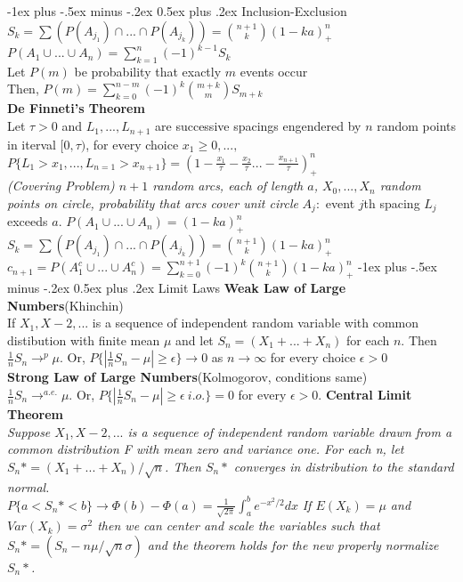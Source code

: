 \documentclass[10pt,landscape]{article}
\makeatletter
\renewcommand{\section}{\@startsection{section}{1}{0mm}%
                                {-1ex plus -.5ex minus -.2ex}%
                                {0.5ex plus .2ex}%
                                {\normalfont\large\bfseries}}
\makeatother
\begin{document}
\begin{multicols*}{3}
\section{Inclusion-Exclusion}
\textit{$S_k= \sum (P(A_{j_1}) \cap...\cap P(A_{j_k}))={n+1 \choose k} (1-ka)^n_+$}\\
\textit{$P(A_1 \cup ...\cup A_n)=\sum_{k=1}^{n} (-1)^{k-1}S_k$}\\
Let $P(m)$ be probability that exactly $m$ events occur \\
Then, \textit{$P(m)=\sum_{k=0}^{n-m}(-1)^{k}{m+k \choose m}S_{m+k}$}\\ 
\textbf{De Finneti's Theorem}\\
Let $\tau>0$ and $L_1 ,..., L_{n+1}$ are successive spacings engendered by $n$ random points in iterval $[0,\tau)$, for every choice $x_1\geq 0, ...,$
\textit{$P\{L_1>x_1,...,L_{n=1}>x_{n+1}\}=(1-\frac{x_1}{\tau}-\frac{x_2}{\tau}...-\frac{x_{n+1}}{\tau})^n_+$}\\
\textit{(Covering Problem) $n+1$ random arcs, each of length $a$, $X_0,...,X_n$ random points on circle, probability that arcs cover unit circle}
$A_j:$ event $j$th spacing $L_j$ exceeds $a$. \textit{$P(A_1 \cup ...\cup A_n)=(1-ka)^n_+$}
\textit{$S_k= \sum (P(A_{j_1}) \cap...\cap P(A_{j_k}))={n+1 \choose k} (1-ka)^n_+$}\\
\textit{$c_{n+1}=P(A_{1}^{c} \cup ...\cup A_{n}^{c})=\sum_{k=0}^{n+1}(-1)^{k}{n+1 \choose k}(1-ka)^n_+$ }  
\section{Limit Laws}
\textbf{Weak Law of Large Numbers}(Khinchin)\\
If $X_1,X-2,...$ is a sequence of independent random variable with common distibution with finite mean $\mu$ and let $S_n=(X_1+...+X_n)$ for each $n$. Then $\frac{1}{n} S_n \rightarrow^{p} \mu$. Or, $P\{|\frac{1}{n} S_n - \mu | \geq \epsilon\} \rightarrow 0$ as $n \rightarrow \infty$ for every choice $\epsilon>0$\\
\textbf{Strong Law of Large Numbers}(Kolmogorov, conditions same)\\
$\frac{1}{n} S_n \rightarrow^{a.e.} \mu$. Or,  $P\{|\frac{1}{n} S_n - \mu | \geq \epsilon\ i.o.\}=0$ for every $\epsilon>0$.
\textbf{Central Limit Theorem}\\
\textit{Suppose $X_1,X-2,...$ is a sequence of independent random variable drawn from a common distribution F with mean zero and variance one. For each n, let $S_n*=(X_1+...+X_n)/\sqrt{n}$. Then $S_n*$ converges in distribution to the standard normal.}\\
	$P\{a<S_n*<b\}\rightarrow\Phi(b)-\Phi(a)=\frac{1}{\sqrt{2\pi}}\int_{a}^{b}e^{-x^2/2}dx$
\textit{If $E(X_k)=\mu$ and $Var(X_k)=\sigma^2$ then we can center and scale the variables such that $S_n*=(S_n - n\mu/\sqrt{n}\sigma)$ and the theorem holds for the new properly normalize $S_n*$.}


\end{multicols*}
\end{document}
